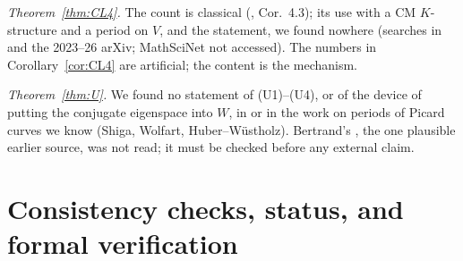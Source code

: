 \documentclass[11pt]{amsart}
\theoremstyle{definition}
\begin{document}
\emph{Theorem~\ref{thm:CL4}.} The count is classical (\cite[(4.2)]{W88}, Cor.~4.3); its use with a CM $K$-structure and a
period on $V$, and the statement, we found nowhere (searches in \cite{RW93,Roy92,W05} and the 2023--26 arXiv; MathSciNet not
accessed). The numbers in Corollary~\ref{cor:CL4} are artificial; the content is the mechanism.

\emph{Theorem~\ref{thm:U}.} We found no statement of (U1)--(U4), or of the device of putting the conjugate eigenspace into
$W$, in \cite{W88,W83,RW93} or in the work on periods of Picard curves we know (Shiga, Wolfart, Huber--W\"ustholz). Bertrand's
\cite{Be83}, the one plausible earlier source, was not read; it must be checked before any external claim.

\section{Consistency checks, status, and formal verification}\label{sec:status}
\end{document}
